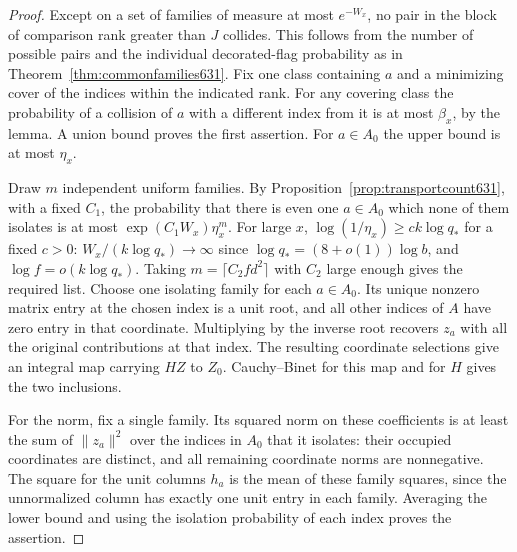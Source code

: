 \documentclass[a4paper,11pt]{article}
\theoremstyle{definition}
\theoremstyle{remark}
\numberwithin{equation}{section}
\begin{document}
\begin{proof}
Except on a set of families of measure at most \(e^{-W_x}\), no pair
in the block of comparison rank greater than \(J\) collides.
This follows from the number of possible pairs and the individual
decorated-flag probability as in Theorem~\ref{thm:commonfamilies631}.
Fix one class containing \(a\) and a minimizing cover of the indices
within the indicated rank. For any covering class the probability
of a collision of \(a\) with a different index from it is at most
\(\beta_x\), by the lemma. A union bound proves the first assertion.
For \(a\in A_0\) the upper bound is at most \(\eta_x\).

Draw \(m\) independent uniform families. By
Proposition~\ref{prop:transportcount631}, with a fixed \(C_1\),
the probability that there is even one \(a\in A_0\) which none of
them isolates is at most \(\exp(C_1W_x)\eta_x^m\). For large \(x\),
\(\log(1/\eta_x)\ge c k\log q_*\) for a fixed \(c>0\):
\(W_x/(k\log q_*)\to\infty\) since \(\log q_*=(8+o(1))\log b\),
and \(\log f=o(k\log q_*)\). Taking \(m=\lceil C_2fd^2\rceil\)
with \(C_2\) large enough gives the required list. Choose one
isolating family for each \(a\in A_0\). Its unique nonzero
matrix entry at the chosen index is a unit root, and all other
indices of \(A\) have zero entry in that coordinate.
Multiplying by the inverse root recovers \(z_a\) with all the
original contributions at that index. The resulting coordinate
selections give an integral map carrying \(HZ\) to \(Z_0\).
Cauchy--Binet for this map and for \(H\) gives the two inclusions.

For the norm, fix a single family. Its squared norm on these
coefficients is at least the sum of \(\|z_a\|^2\) over the indices
in \(A_0\) that it isolates: their occupied coordinates are distinct,
and all remaining coordinate norms are nonnegative. The square
for the unit columns \(h_a\) is the mean of these family squares,
since the unnormalized column has exactly one unit entry in each
family. Averaging the lower bound and using the isolation probability
of each index proves the assertion.
\end{proof}
\end{document}
